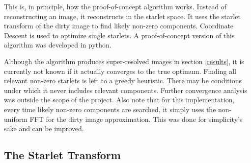 This is, in principle, how the proof-of-concept algorithm works. Instead of reconstructing an image, it reconstructs in the starlet space. It uses the starlet transform of the dirty image to find likely non-zero components. Coordinate Descent is used to optimize single starlets. A proof-of-concept version of this algorithm was developed in python.

Although the algorithm produces super-resolved images in section \ref{results}, it is currently not known if it actually converges to the true optimum. Finding all relevant non-zero starlets is left to a greedy heuristic. There may be conditions under which it never includes relevant components. Further convergence analysis was outside the scope of the project. Also note that for this implementation, every time likely non-zero components are searched, it simply uses the non-uniform FFT for the dirty image approximation. This was done for simplicity's sake and can be improved.


\subsection{The Starlet Transform} \label{cd:starlets}

